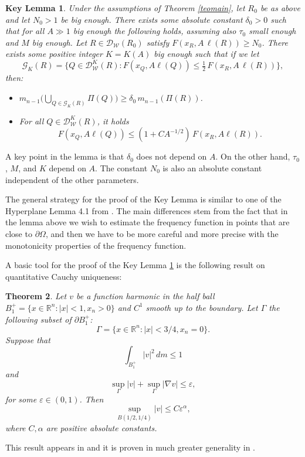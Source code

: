 \documentclass[11pt]{amsart}
\newcommand{\R}{{\mathbb R}}       %
\newcommand{\DD}{{\mathcal D}}
\newcommand{\WW}{{\mathcal W}}
\newcommand{\GZ}{{\mathcal G}}
\newcommand{\ve}{{\varepsilon}}
\newcommand{\vv}{{\vspace{2mm}}}
\newtheorem{theorem}{Theorem}[section]
\newtheorem{keylemma}[theorem]{Key Lemma}
\theoremstyle{definition}
\theoremstyle{remark}
\numberwithin{equation}{section}
\begin{document}
\begin{keylemma}\label{keylemma}
Under the assumptions of Theorem \ref{teomain},
let $R_0$ be as above and let $N_0>1$ be big enough. There exists some absolute constant $\delta_0>0$ such that for all $A\gg1$ big enough the following holds, assuming also $\tau_0$ small enough
and $M$ big enough.
Let $R\in \DD_\WW(R_0)$ satisfy $F(x_R,A\,\ell(R))\geq N_0$.
There exists some positive integer $K=K(A)$ big enough such that if we let 
$$\GZ_K(R)=\big\{Q\in\DD_\WW^K(R):F(x_Q,A\ell(Q))\leq \tfrac12 \, F(x_R,A\,\ell(R))\big\},$$
then:
\begin{itemize}
\item[(a)] $m_{n-1}\Big(\bigcup_{Q\in \GZ_K(R)} \Pi(Q)\Big) \geq \delta_0\,m_{n-1}(\Pi(R))$.

\item[(b)] For all $Q\in \DD_\WW^K(R)$, it holds
$$F(x_Q,A\ell(Q))\leq (1+CA^{-1/2})\,F(x_R,A\ell(R)).$$
\end{itemize}
\end{keylemma}

A key point in the lemma is that $\delta_0$ does not depend on $A$. On the other hand, $\tau_0$, $M$, and $K$
depend on $A$. The constant $N_0$ is also an absolute constant independent of the other parameters.

The general strategy for the proof of the Key Lemma is similar to one of the Hyperplane Lemma 4.1 from \cite{Logunov1}. The main differences stem from the fact that in the lemma above we wish to estimate the frequency function
in points that are close to $\partial\Omega$, and then we have to be more careful and more precise with the monotonicity
properties of the frequency function.

A basic tool for the proof of the Key Lemma \ref{keylemma} is the following result on quantitative Cauchy uniqueness:

\begin{theorem}\label{teoARRV}
Let $v$ be a function harmonic in the half ball $B_1^+ =\{x\in\R^n:|x|<1,x_n>0\}$ and $C^1$ smooth up to
the boundary. Let $\Gamma$ the following subset of $\partial B_1^+$:
$$\Gamma =\{x\in\R^n:|x|<3/4,x_n=0\}.$$
Suppose that
$$\int_{B_1^+}|v|^2\,dm\leq 1$$
and
$$\sup_{\Gamma}|v| + \sup_{\Gamma}|\nabla v| \leq \ve,$$
for some $\ve\in(0,1)$. Then
$$\sup_{B(1/2,1/4)}|v|\leq C\ve^\alpha,$$
where  $C,\alpha$ are positive absolute constants.
\end{theorem}

This result appears in \cite[Lemma 4.3]{Lin} and it is proven in much greater generality in 
\cite[Theorem 1.7]{ARRV}.
\vv
\end{document}
